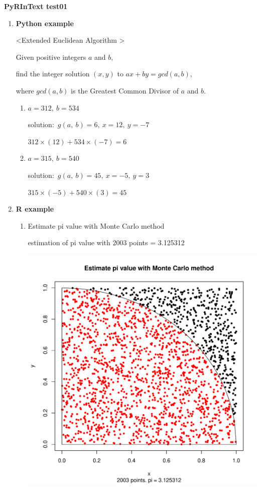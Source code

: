 \documentclass[a4paper]{article}
\begin{document}
	{\Large\bf PyRInText test01} %

	\begin{enumerate}
		\item {\bf Python example}

			\textless Extended Euclidean Algorithm \textgreater\vspace{1mm}\par
			Given positive integers $a$ and $b$,\par
			find the integer solution $(x, y)$ to $ax+by=gcd(a,b)$, \par
			where $gcd(a,b)$ is the Greatest Common Divisor of $a$ and $b$.
			\begin{enumerate}
				\item 
					$a= 312 ,~b= 534$\par
					solution:~$g(a,~b)=6,~x=12,~y=-7$\par
					$312\times(12)+534\times(-7)=6$
				\item 
					$a= 315 ,~b= 540$\par
					{\color{white}
					solution:~$g(a,~b)=45,~x=-5,~y=3$\par
					$315\times(-5)+540\times(3)=45$}

			\end{enumerate}

		\item {\bf R example}

			\begin{enumerate}
				\item Estimate pi value with Monte Carlo method\par
					estimation of pi value with 
						2003 points = 3.125312
					

					\includegraphics[scale=0.40,clip]{mc_pi.pdf}


\end{enumerate}
\end{enumerate}
\end{document}
